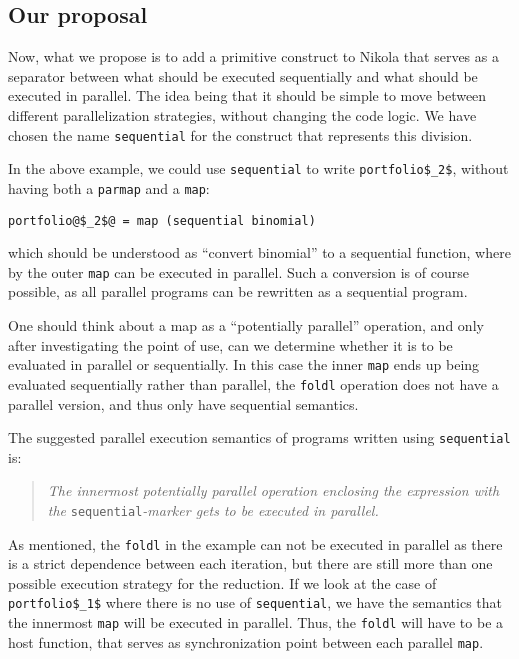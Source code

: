 \subsection{Our proposal}
Now, what we propose is to add a primitive construct to Nikola that
serves as a separator between what should be executed sequentially and
what should be executed in parallel. The idea being that it should be
simple to move between different parallelization strategies, without
changing the code logic. We have chosen the name \lstinline{sequential}
for the construct that represents this division.

In the above example, we could use \lstinline{sequential} to write
\lstinline[mathescape]{portfolio$_2$}, without having both a \lstinline{parmap}
and a \lstinline{map}:
\begin{lstlisting}
portfolio@$_2$@ = map (sequential binomial)
\end{lstlisting}
which should be understood as ``convert binomial'' to a sequential
function, where by the outer \lstinline{map} can be executed in
parallel. Such a conversion is of course possible, as all parallel
programs can be rewritten as a sequential program.

One should think about a map as a ``potentially parallel'' operation,
and only after investigating the point of use, can we determine
whether it is to be evaluated in parallel or sequentially. In this
case the inner \lstinline{map} ends up being evaluated sequentially
rather than parallel, the \lstinline{foldl} operation does not have a
parallel version, and thus only have sequential semantics.

The suggested parallel execution semantics of programs written using
\lstinline{sequential} is:
\begin{quote}
  \emph{The innermost potentially parallel operation enclosing the
    expression with the }\lstinline{sequential}\emph{-marker gets to
    be executed in parallel.}
\end{quote}

As mentioned, the \lstinline{foldl} in the example can not be executed
in parallel as there is a strict dependence between each iteration,
but there are still more than one possible execution strategy for the
reduction. If we look at the case of
\lstinline[mathescape]{portfolio$_1$} where there is no use of
\lstinline{sequential}, we have the semantics that the innermost
\lstinline{map} will be executed in parallel. Thus, the
\lstinline{foldl} will have to be a host function, that serves as
synchronization point between each parallel \lstinline{map}.

